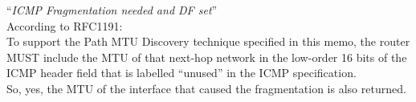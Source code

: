 ``\textit{ICMP Fragmentation needed and DF set}''\\
According to RFC1191: \\
 To support the Path MTU Discovery technique specified in this memo, the router MUST include the MTU of that next-hop network in the low-order 16 bits of the ICMP header field that is labelled ``unused'' in the ICMP specification.\\
 So, yes, the MTU of the interface that caused the fragmentation is also returned.
